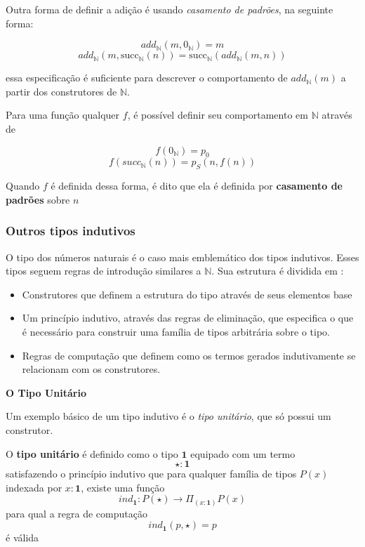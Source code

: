 \documentclass[../main.tex]{subfiles}
\begin{document}
Outra forma de definir a adição é usando \emph{casamento de padrões}, na seguinte forma:

$$add_{\mathbb{N}}(m, 0_{\mathbb{N}}) = m$$
$$add_{\mathbb{N}}(m, \text{succ}_{\mathbb{N}}(n)) = \text{succ}_{\mathbb{N}}(add_{\mathbb{N}}(m, n))$$

essa especificação é suficiente para descrever o comportamento de $add_{\mathbb{N}}(m)$ a partir dos construtores de $\mathbb{N}$.

Para uma função qualquer $f$, é possível definir seu comportamento em $\mathbb{N}$ através de 

$$f(0_{\mathbb{N}}) = p_0$$
$$f(succ_{\mathbb{N}}(n)) = p_S(n, f(n))$$

Quando $f$ é definida dessa forma, é dito que ela é definida por \textbf{casamento de padrões} sobre $n$


\subsubsection{Outros tipos indutivos}

O tipo dos números naturais é o caso mais emblemático dos tipos indutivos. Esses tipos seguem regras de introdução similares a $\mathbb{N}$. Sua estrutura é dividida em :

\begin{itemize}
    \item Construtores que definem a estrutura do tipo através de seus elementos base
    \item Um princípio indutivo, através das regras de eliminação, que especifica o que é necessário para construir uma família de tipos arbitrária sobre o tipo.
    \item Regras de computação que definem como os termos gerados indutivamente se relacionam com os construtores.
\end{itemize}

\textbf{O Tipo Unitário}

Um exemplo básico de um tipo indutivo é o \emph{tipo unitário}, que só possui um construtor.

\begin{definition}
    O \textbf{tipo unitário} é definido como o tipo $\mathbf{1}$ equipado com um termo $$\star : \mathbf{1}$$ satisfazendo o princípio indutivo que para qualquer família de tipos $P(x)$ indexada por $x : \mathbf{1}$, existe uma função $$ind_{\mathbf{1}} : P(\star) \to \Pi_{(x : \mathbf{1})} P(x)$$ para qual a regra de computação $$ind_{\mathbf{1}}(p, \star) = p$$ é válida
\end{definition}
\end{document}

